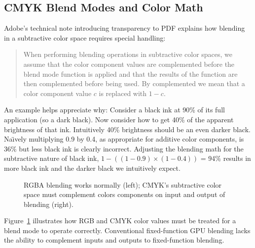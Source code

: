 \subsection{CMYK Blend Modes and Color Math}
\label{sec:cmykblend}

Adobe's technical note introducing transparency to PDF \cite{TransparencyInPDF} explains how blending
in a subtractive color space requires special handling:
\begin{quote}
\small
When performing blending
operations in subtractive color spaces, we assume that the color component values are complemented before the blend mode function is applied and that the results of the function are then complemented before being used. By
complemented we mean that a color component value $c$ is replaced with $1 - c$. 
\end{quote}
An example helps appreciate why:  Consider a black ink at 90\% of its full application (so a dark black).  Now
consider how to get 40\% of the apparent brightness of that ink.  Intuitively 40\% brightness should be an
even darker black.
Na\"{\i}vely multiplying 0.9 by 0.4, as appropriate for additive color
components, is 36\% but less black ink is clearly incorrect.
Adjusting the blending math for the subtractive nature of black ink,
$1-((1-0.9)\times(1-0.4))$ = 94\% results in more black ink and the darker black we intuitively expect.

\begin{figure}[tb]
  \caption{\label{fig:rgba-vs-cmyk-blending} RGBA blending works normally (left); CMYK's subtractive color space must complement colors components on input and output of blending (right).}
\end{figure}

Figure~\ref{fig:rgba-vs-cmyk-blending} illustrates how RGB and CMYK
color values must be treated for a blend mode to operate correctly.
Conventional fixed-function GPU blending lacks the ability to complement
inputs and outputs to fixed-function blending.

